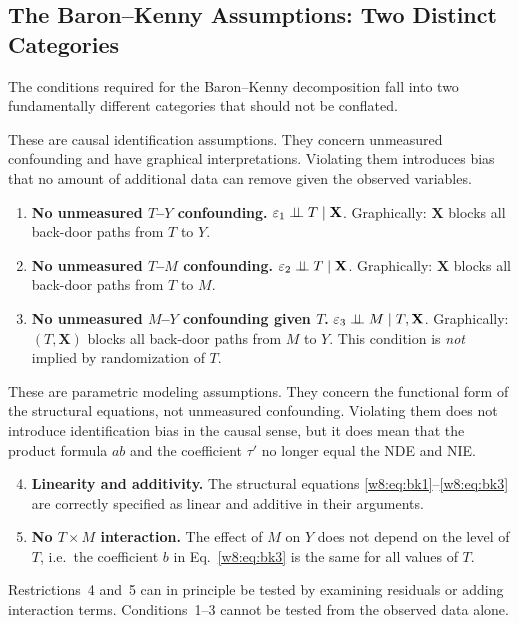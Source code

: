 \documentclass[master.tex]{subfiles}
\begin{document}
\subsection{The Baron--Kenny Assumptions: Two Distinct Categories}

The conditions required for the Baron--Kenny decomposition fall into
two fundamentally different categories that should not be conflated.

\begin{tcolorbox}[defstyle,
  title={Baron--Kenny Causal Ignorability Conditions}]
These are causal identification assumptions.  They concern unmeasured
confounding and have graphical interpretations.  Violating them
introduces bias that no amount of additional data can remove given the
observed variables.
\begin{enumerate}
  \item \textbf{No unmeasured $T$--$Y$ confounding.}
    $\varepsilon_1 \perp\!\!\!\perp T \mid \mathbf{X}$.
    Graphically: $\mathbf{X}$ blocks all back-door paths from $T$
    to $Y$.
  \item \textbf{No unmeasured $T$--$M$ confounding.}
    $\varepsilon_2 \perp\!\!\!\perp T \mid \mathbf{X}$.
    Graphically: $\mathbf{X}$ blocks all back-door paths from $T$
    to $M$.
  \item \textbf{No unmeasured $M$--$Y$ confounding given $T$.}
    $\varepsilon_3 \perp\!\!\!\perp M \mid T, \mathbf{X}$.
    Graphically: $(T, \mathbf{X})$ blocks all back-door paths from
    $M$ to $Y$.  This condition is \emph{not} implied by
    randomization of $T$.
\end{enumerate}
\end{tcolorbox}

\begin{tcolorbox}[defstyle,
  title={Baron--Kenny Structural Modeling Restrictions}]
These are parametric modeling assumptions.  They concern the functional
form of the structural equations, not unmeasured confounding.
Violating them does not introduce identification bias in the causal
sense, but it does mean that the product formula $ab$ and the
coefficient $\tau'$ no longer equal the NDE and NIE.
\begin{enumerate}
  \setcounter{enumi}{3}
  \item \textbf{Linearity and additivity.}  The structural equations
    \eqref{w8:eq:bk1}--\eqref{w8:eq:bk3} are correctly specified as
    linear and additive in their arguments.
  \item \textbf{No $T \times M$ interaction.}  The effect of $M$ on
    $Y$ does not depend on the level of $T$, i.e.\ the coefficient
    $b$ in Eq.~\eqref{w8:eq:bk3} is the same for all values of $T$.
\end{enumerate}
Restrictions~4 and~5 can in principle be tested by examining residuals
or adding interaction terms.  Conditions~1--3 cannot be tested from
the observed data alone.
\end{tcolorbox}
\end{document}
